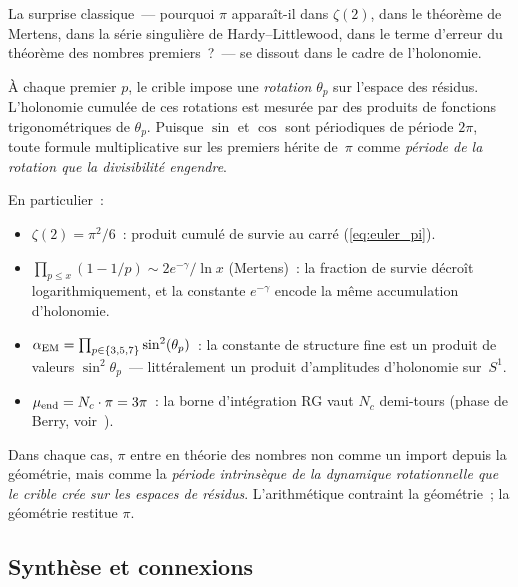\documentclass[12pt,a4paper]{article}
\begin{document}
\begin{remarque}
\label{rem:why_pi_in_primes}
La surprise classique~--- pourquoi $\pi$ apparaît-il dans
$\zeta(2)$, dans le théorème de Mertens, dans la série singulière
de Hardy--Littlewood, dans le terme d'erreur du théorème des nombres
premiers~?~--- se dissout dans le cadre de l'holonomie.

À chaque premier $p$, le crible impose une \emph{rotation}
$\theta_p$ sur l'espace des résidus. L'holonomie cumulée de ces
rotations est mesurée par des produits de fonctions
trigonométriques de $\theta_p$. Puisque $\sin$ et $\cos$ sont
périodiques de période $2\pi$, toute formule multiplicative sur les
premiers hérite de~$\pi$ comme \emph{période de la rotation que la
divisibilité engendre}.

En particulier~:
\begin{itemize}[nosep]
\item $\zeta(2) = \pi^2/6$~: produit cumulé de survie au carré
  (\cref{eq:euler_pi}).
\item $\prod_{p \leq x}(1 - 1/p) \sim 2e^{-\gamma}/\ln x$
  (Mertens)~: la fraction de survie décroît logarithmiquement, et
  la constante $e^{-\gamma}$ encode la même accumulation
  d'holonomie.
\item $\alpha_{\mathrm{EM}} = \prod_{p \in \{3,5,7\}} \sin^2(\theta_{p})$~: la constante
  de structure fine est un produit de valeurs $\sin^2\!\theta_p$~---
  littéralement un produit d'amplitudes d'holonomie sur~$S^1$.
\item $\mu_{\rm end} = N_c \cdot \pi = 3\pi$~: la borne
  d'intégration RG vaut $N_c$ demi-tours (phase de Berry,
  voir~\cite{companion_physics}).
\end{itemize}

Dans chaque cas, $\pi$ entre en théorie des nombres non comme un
import depuis la géométrie, mais comme la \emph{période intrinsèque
de la dynamique rotationnelle que le crible crée sur les espaces de
résidus}. L'arithmétique contraint la géométrie~; la géométrie
restitue $\pi$.
\end{remarque}

\subsection{Synthèse et connexions}
\label{sec:ch6_summary}
\end{document}
